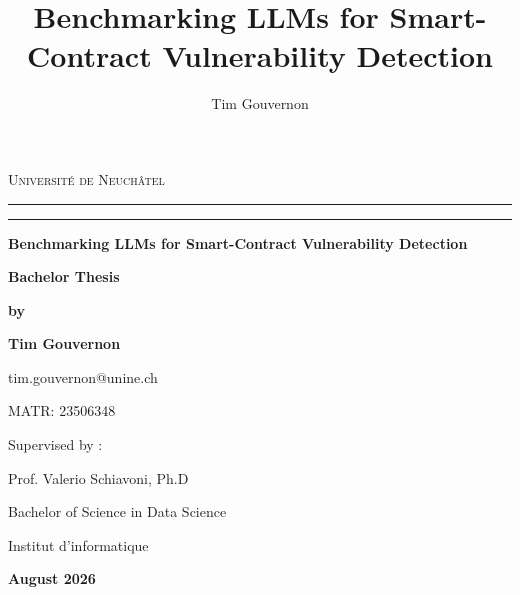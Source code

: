 \documentclass[a4paper,11pt]{article}\usepackage{graphicx} %
\title{Benchmarking LLMs for Smart-Contract Vulnerability Detection}
\author{Tim Gouvernon}
\date{}
\begin{document}
\begin{titlepage}
\begin{center}

{{\Large\textsc{Université de Neuchâtel}}}

\rule[0.1cm]{15.8cm}{0.1mm}
\rule[0.5cm]{15.8cm}{0.6mm}

\vspace{10mm}

{\Huge\bfseries Benchmarking LLMs for Smart-Contract Vulnerability Detection}

\vspace{5mm}

{\Large\bfseries Bachelor Thesis}

\vspace{30mm}

{\Large\bfseries by}

\vspace{15mm}

{\Large\bfseries Tim Gouvernon}

\vspace{5mm}

{\large tim.gouvernon@unine.ch}

\vspace{5mm}

{\large MATR: 23506348}

\vspace{15mm}

\vspace{5mm}

{\Large Supervised by :}

\vspace{5mm}

{\Large Prof. Valerio Schiavoni, Ph.D}

\vspace{50mm}

{\Large Bachelor of Science in Data Science}

\vspace{5mm}

{\large Institut d'informatique}

\vspace{5mm}

{\Large\bfseries August 2026}

\end{center}
\end{titlepage}
\end{document}
